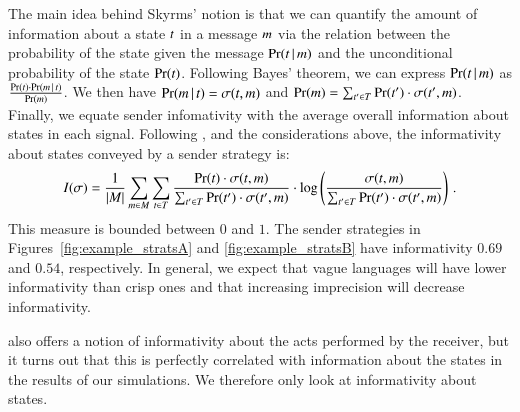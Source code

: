 The main idea behind Skyrms' notion is that we can quantify the amount
of information about a state $t$ in a message $m$ via the
relation between the probability of the state given the message
$\Pr(t \,|\, m)$ and the unconditional probability of the
state $\Pr(t)$.  Following Bayes' theorem, we can express
$\Pr(t \,|\, m)$ as $\frac{\Pr(t) \cdot \Pr(m
  \,|\, t)}{\Pr(m)}$.  We then have $\Pr(m \,|\,
t) = \sigma(t,m)$ and $\Pr(m) =
\sum_{t^\prime \in T} \Pr(t^\prime) \cdot
\sigma(t^\prime,m)$.  Finally, we equate sender
infomativity with the average overall information about states in each
signal.  Following \citet[p.~36]{Skyrms2010:Signals}, and the
considerations above, the informativity about states conveyed by a
sender strategy is:
\begin{align*}
  I(\sigma) = \frac{1}{|M|} \sum_{m \in M}
  \sum_{t \in T} \frac{\Pr(t) \cdot
    \sigma(t,m)}{\sum_{t^\prime \in T}
    \Pr(t^\prime) \cdot \sigma(t^\prime,m)} \cdot \log
  \left(\frac{\sigma(t,m)}{\sum_{t^\prime \in T}
      \Pr(t^\prime) \cdot \sigma(t^\prime,m)} \right)
  \,. 
\end{align*}
This measure is bounded between $0$ and $1$. The sender strategies in
Figures~\ref{fig:example_stratsA} and \ref{fig:example_stratsB} have
informativity $0.69$ and $0.54$, respectively. In general, we expect
that vague languages will have lower informativity than crisp
ones and that increasing imprecision will decrease informativity. 

\citet[p.~39]{Skyrms2010:Signals} also offers a notion of
informativity about the acts performed by the receiver, but it turns
out that this is perfectly correlated with information about the
states in the results of our simulations. We therefore only look at
informativity about states. 


